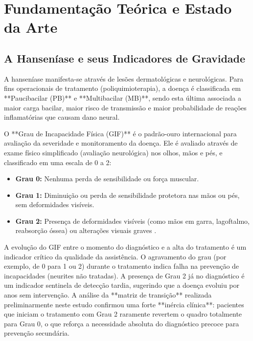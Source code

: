 \documentclass[12pt, a4paper]{report}
\begin{document}
\chapter{Fundamentação Teórica e Estado da Arte}

\section{A Hanseníase e seus Indicadores de Gravidade}
A hanseníase manifesta-se através de lesões dermatológicas e neurológicas. Para fins operacionais de tratamento (poliquimioterapia), a doença é classificada em **Paucibacilar (PB)** e **Multibacilar (MB)**, sendo esta última associada a maior carga bacilar, maior risco de transmissão e maior probabilidade de reações inflamatórias que causam dano neural.

O **Grau de Incapacidade Física (GIF)** é o padrão-ouro internacional para avaliação da severidade e monitoramento da doença. Ele é avaliado através de exame físico simplificado (avaliação neurológica) nos olhos, mãos e pés, e classificado em uma escala de 0 a 2:
\begin{itemize}
    \item \textbf{Grau 0:} Nenhuma perda de sensibilidade ou força muscular.
    \item \textbf{Grau 1:} Diminuição ou perda de sensibilidade protetora nas mãos ou pés, sem deformidades visíveis.
    \item \textbf{Grau 2:} Presença de deformidades visíveis (como mãos em garra, lagoftalmo, reabsorção óssea) ou alterações visuais graves \citep{brasil2017guia}.
\end{itemize}
A evolução do GIF entre o momento do diagnóstico e a alta do tratamento é um indicador crítico da qualidade da assistência. O agravamento do grau (por exemplo, de 0 para 1 ou 2) durante o tratamento indica falha na prevenção de incapacidades (neurites não tratadas). A presença de Grau 2 já no diagnóstico é um indicador sentinela de detecção tardia, sugerindo que a doença evoluiu por anos sem intervenção. A análise da **matriz de transição** realizada preliminarmente neste estudo confirmou uma forte **inércia clínica**: pacientes que iniciam o tratamento com Grau 2 raramente revertem o quadro totalmente para Grau 0, o que reforça a necessidade absoluta do diagnóstico precoce para prevenção secundária.
\end{document}
